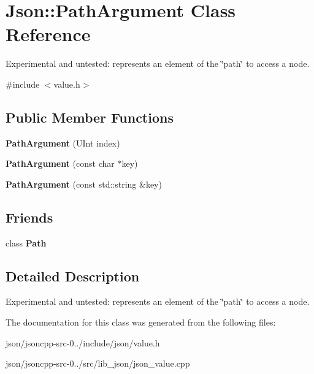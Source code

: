 \hypertarget{class_json_1_1_path_argument}{\section{Json\+:\+:Path\+Argument Class Reference}
\label{class_json_1_1_path_argument}
}


Experimental and untested\+: represents an element of the \char`\"{}path\char`\"{} to access a node.  




{\ttfamily \#include $<$value.\+h$>$}

\subsection*{Public Member Functions}
\begin{DoxyCompactItemize}
\item 
\hypertarget{class_json_1_1_path_argument_aac8f1bee92e1955d4902acccbbc73a70}{{\bfseries Path\+Argument} (U\+Int index)}\label{class_json_1_1_path_argument_aac8f1bee92e1955d4902acccbbc73a70}

\item 
\hypertarget{class_json_1_1_path_argument_a9690417a8a40e6e49f2acdf6c9281345}{{\bfseries Path\+Argument} (const char $\ast$key)}\label{class_json_1_1_path_argument_a9690417a8a40e6e49f2acdf6c9281345}

\item 
\hypertarget{class_json_1_1_path_argument_a08f872cfee4fc600f7fa3bcaaff0d41c}{{\bfseries Path\+Argument} (const std\+::string \&key)}\label{class_json_1_1_path_argument_a08f872cfee4fc600f7fa3bcaaff0d41c}

\end{DoxyCompactItemize}
\subsection*{Friends}
\begin{DoxyCompactItemize}
\item 
\hypertarget{class_json_1_1_path_argument_a4877239a6b7f09fbf5a61ca68a49d74c}{class {\bfseries Path}}\label{class_json_1_1_path_argument_a4877239a6b7f09fbf5a61ca68a49d74c}

\end{DoxyCompactItemize}


\subsection{Detailed Description}
Experimental and untested\+: represents an element of the \char`\"{}path\char`\"{} to access a node. 

The documentation for this class was generated from the following files\+:\begin{DoxyCompactItemize}
\item 
json/jsoncpp-\/src-\/0../include/json/value.\+h\item 
json/jsoncpp-\/src-\/0../src/lib\+\_\+json/json\+\_\+value.\+cpp\end{DoxyCompactItemize}
